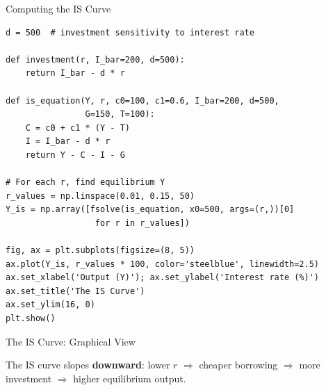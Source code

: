 \documentclass[aspectratio=169, 10pt]{beamer}
\begin{document}
\begin{frame}[fragile]{Computing the IS Curve}
\begin{lstlisting}
d = 500  # investment sensitivity to interest rate

def investment(r, I_bar=200, d=500):
    return I_bar - d * r

def is_equation(Y, r, c0=100, c1=0.6, I_bar=200, d=500,
                G=150, T=100):
    C = c0 + c1 * (Y - T)
    I = I_bar - d * r
    return Y - C - I - G

# For each r, find equilibrium Y
r_values = np.linspace(0.01, 0.15, 50)
Y_is = np.array([fsolve(is_equation, x0=500, args=(r,))[0]
                  for r in r_values])

fig, ax = plt.subplots(figsize=(8, 5))
ax.plot(Y_is, r_values * 100, color='steelblue', linewidth=2.5)
ax.set_xlabel('Output (Y)'); ax.set_ylabel('Interest rate (%)')
ax.set_title('The IS Curve')
ax.set_ylim(16, 0)
plt.show()
\end{lstlisting}
\end{frame}

\begin{frame}{The IS Curve: Graphical View}
\begin{center}
\end{center}
\vspace{0.3em}
The IS curve slopes \textbf{downward}: lower $r$ $\Rightarrow$ cheaper borrowing
$\Rightarrow$ more investment $\Rightarrow$ higher equilibrium output.
\end{frame}
\end{document}
